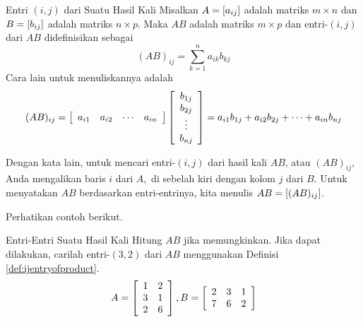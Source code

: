 \begin{definition}{Entri $(i,j)$ dari Suatu Hasil Kali}\label{def:ijentryofproduct}
Misalkan $A=\left[ a_{ij}\right] $ adalah matriks $m\times n$ dan
$B=\left[ b_{ij}\right] $ adalah matriks $n\times p$. Maka $AB$ adalah matriks
$m\times p$ dan entri-$\left( i, j \right)$ dari $AB$  didefinisikan sebagai
\begin{equation*}
(AB)_{ij}=\sum_{k=1}^{n}a_{ik}b_{kj}  
\label{mat12}
\end{equation*}
Cara lain untuk menuliskannya adalah
\begin{equation*}
(AB)_{ij}=\left[
\begin{array}{cccc}
a_{i1} & a_{i2} & \cdots & a_{in}
\end{array}
\right] \left[
\begin{array}{c}
b_{1j} \\
b_{2j} \\
\vdots \\
b_{nj}
\end{array}
\right]
= 
a_{i1}b_{1j} + a_{i2}b_{2j} + \cdots + a_{in}b_{nj}
\end{equation*}
\end{definition}

Dengan kata lain, untuk mencari entri-$\left( i, j \right)$ dari hasil kali $AB$, atau $(AB)_{ij}$,
Anda mengalikan baris $i$ dari
$A,$ di sebelah kiri dengan kolom $j$ dari $B$. Untuk menyatakan $AB$ berdasarkan entri-entrinya, kita menulis $AB = \left[ (AB)_{ij} \right]$.

Perhatikan contoh berikut. 

\begin{example}{Entri-Entri Suatu Hasil Kali}\label{exa:entriesofproduct1}
Hitung $AB$ jika memungkinkan. Jika dapat dilakukan, carilah entri-$\left( 3,2 \right)$ dari $AB$ menggunakan Definisi \ref{def:ijentryofproduct}.
\begin{equation*}
A = \left[
\begin{array}{cc}
1 & 2 \\
3 & 1 \\
2 & 6
\end{array}
\right], B = \left[
\begin{array}{ccc}
2 & 3 & 1 \\
7 & 6 & 2
\end{array}
\right]
\end{equation*}
\end{example}

